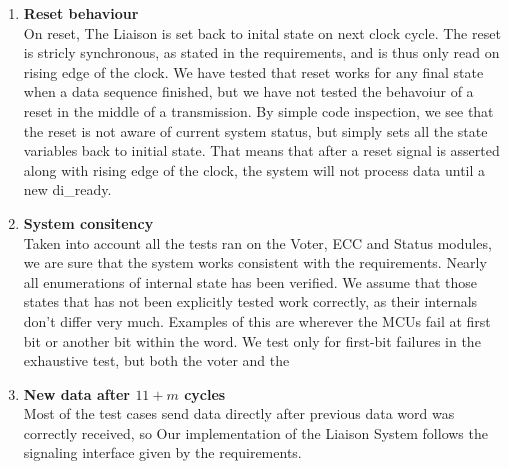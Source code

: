 \begin{enumerate}
\item{\textbf{Reset behaviour}} \hfill\\
    On reset, The Liaison is set back to inital state on next clock cycle. The reset is stricly synchronous,
    as stated in the requirements\cite{task}, and is thus only read on rising edge of the clock. We have
    tested that reset works for any final state when a data sequence finished, but we have not tested the
    behavoiur of a reset in the middle of a transmission. By simple code inspection, we see that the
    reset is not aware of current system status, but simply sets all the state variables back to initial
    state. That means that after a reset signal is asserted along with rising edge of the clock, the system
    will not process data until a new {\ttfamily di\_ready}.

\item{\textbf{System consitency}} \hfill\\
    Taken into account all the tests ran on the Voter, ECC and Status modules, we are sure that the system works consistent
    with the requirements. Nearly all enumerations of internal state has been verified. We assume that those states that has
    not been explicitly tested work correctly, as their internals don't differ very much. Examples of this are wherever the MCUs
    fail at first bit or another bit within the word. We test only for first-bit failures in the exhaustive test, but both the
    voter and the 

\item{\textbf{New data after $11+m$ cycles}} \hfill\\
    Most of the test cases send data directly after previous data word was correctly received, so 
    Our implementation of the Liaison System follows the signaling interface given by the requirements.

\end{enumerate}
